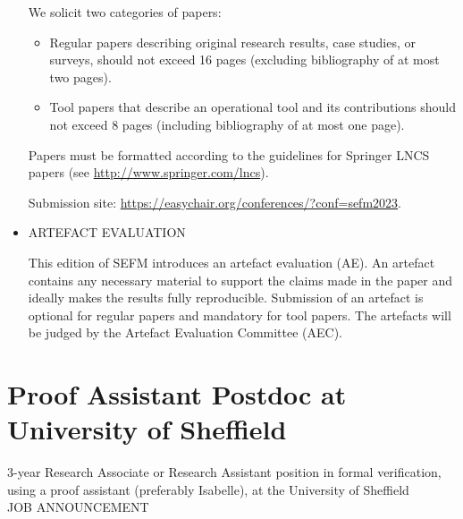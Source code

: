 \documentclass[prodmode,acmtecs]{acmsmall} %
\begin{document}
\begin{itemize}
  We solicit two categories of papers: 
 
\begin{itemize}\item  Regular papers describing original research results, case studies, or surveys, should not exceed 16 pages (excluding bibliography of at most two pages).
\item  Tool papers that describe an operational tool and its contributions should not exceed 8 pages (including bibliography of at most one page).
\end{itemize} 
  Papers must be formatted according to the guidelines for Springer LNCS papers (see \href{http://www.springer.com/lncs}{http://www.springer.com/lncs}). 
 
  Submission site: \href{https://easychair.org/conferences/?conf=sefm2023}{https://easychair.org/conferences/?conf=sefm2023}. 
 
\item   ARTEFACT EVALUATION 
 
  This edition of SEFM introduces an artefact evaluation (AE). An artefact contains any necessary material to support the claims made in the paper and ideally makes the results fully reproducible. Submission of an artefact is optional for regular papers and mandatory for tool papers. The artefacts will be judged by the Artefact Evaluation Committee (AEC). 
 
\end{itemize}\section{Proof Assistant Postdoc at University of Sheffield}\label{ProofAssistantPostdocatUniversityofSheffield}  3-year Research Associate or Research Assistant position in formal verification, using a proof assistant (preferably Isabelle), at the University of Sheffield\\ 
JOB ANNOUNCEMENT 
\end{document}

